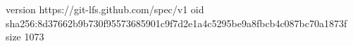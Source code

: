 version https://git-lfs.github.com/spec/v1
oid sha256:8d37662b9b730f95573685901c9f7d2e1a4c5295be9a8fbcb4c087bc70a1873f
size 1073
